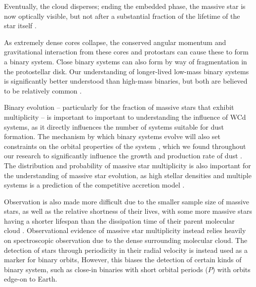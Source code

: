 Eventually, the cloud disperses; ending the embedded phase, the massive star is now optically visible, but not after a substantial fraction of the lifetime of the star itself \parencite{kimDurationEmbeddedPhase2021}.

As extremely dense cores collapse, the conserved angular momentum and gravitational interaction from these cores and protostars can cause these to form a binary system.
Close binary systems can also form by way of fragmentation in the protostellar disk.
Our understanding of longer-lived low-mass binary systems is significantly better understood than high-mass binaries, but both are believed to be relatively common \parencite{ducheneStellarMultiplicity2013}.

Binary evolution -- particularly for the fraction of massive stars that exhibit multiplicity -- is important to important to understanding the influence of WCd systems, as it directly influences the number of systems suitable for dust formation.
The mechanism by which binary systems evolve will also set constraints on the orbital properties of the system \parencite{ducheneStellarMultiplicity2013,dsilvaSpectroscopicMultiplicitySurvey2022a}, which we found throughout our research to significantly influence the growth and production rate of dust \parencite{eatsonExploringDustGrowth2022}.
The distribution and probability of massive star multiplicity is also important for the understanding of massive star evolution, as high stellar densities and multiple systems is a prediction of the competitive accretion model 
\parencite{chiniSpectroscopicSurveyMultiplicity2012,zinneckerUnderstandingMassiveStar2007}.


Observation is also made more difficult due to the smaller sample size of massive stars, as well as the relative shortness of their lives, with some more massive stars having a shorter lifespan than the dissipation time of their parent molecular cloud \parencite{zinneckerUnderstandingMassiveStar2007}. 
Observational evidence of massive star multiplicity instead relies heavily on spectroscopic observation due to the dense surrounding molecular cloud.
The detection of stars through periodicity in their radial velocity is instead used as a marker for binary orbits, 
However, this biases the detection of certain kinds of binary system, such as close-in binaries with short orbital periods ($P$) with orbits edge-on to Earth.

